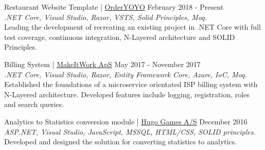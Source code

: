 \documentclass[margin, 10pt, hidelinks]{res} %
\newcommand{\tab}{\hspace*{1em}} %
\begin{document}
\begin{resume}
Restaurant Website Template | \href{https://orderyoyo.com/}{\underline{OrderYOYO}} \hfill February 2018  - Present\\
{\it .NET Core, Visual Studio, Razor, VSTS, Solid Principles, Moq.} \\
\tab Leading the development of recreating an existing project in .NET Core with full test coverage, continuous integration, N-Layered architecture and SOLID Principles.

Billing System | \href{http://www.makeitwork.dk}{\underline{MakeItWork ApS}} \hfill May 2017  - November 2017\\
{\it .NET Core, Visual Studio, Razor, Entity Framework Core, Azure, IoC, Moq.} \\
\tab Established the foundations of a microservice orientated ISP billing system with N-Layered architecture. Developed features include logging, registration, roles and search queries.


Analytics to Statistics conversion module | \href{https://hugogames.com/}{\underline{Hugo Games A/S}} \hfill December 2016  \\
{\it ASP.NET, Visual Studio, JavaScript,  MSSQL, HTML/CSS, SOLID principles.}  \\
 \tab Developed and designed the solution for converting statistics to analytics.




\end{resume}
\end{document}
